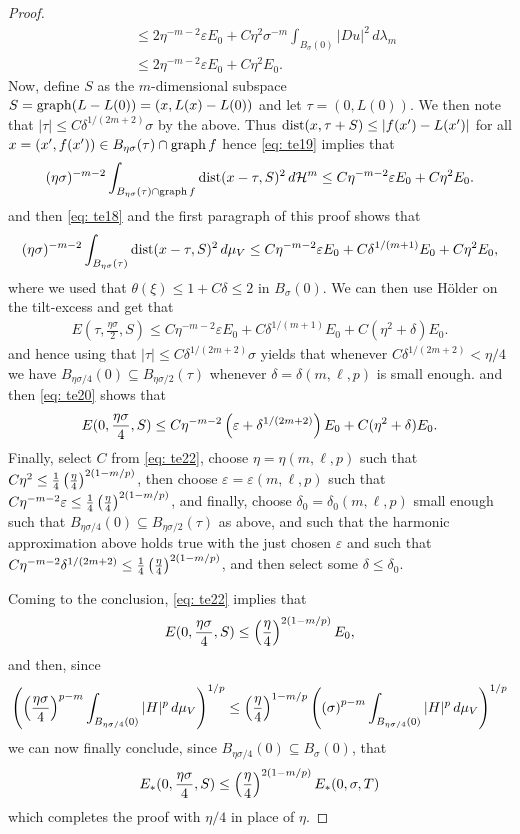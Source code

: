 \begin{proof}
\begin{align}
    &\le 2\eta^{-m-2}\varepsilon E_0 + C\eta^2\sigma^{-m} \int_{B_{\sigma}(0)} |Du|^2\, d\lambda_m \nonumber\\
    &\le 2\eta^{-m-2}\varepsilon E_0 + C\eta^2E_0.\label{eq: te19}
\end{align}
Now, define $S$ as the $m$-dimensional subspace $S=\operatorname{graph}(L-L(0)) = (x,L(x)-L(0))$ and let $\tau=(0,L(0))$. We then note that $|\tau| \le C\delta^{1/(2m+2)}\sigma$ by the above. Thus $\operatorname{dist}(x,\tau+S) \le |f(x') - L(x')|$ for all $x = (x',f(x')) \in B_{\eta\sigma}(\tau) \cap \operatorname{graph} f$ hence \eqref{eq: te19} implies that
\[
    (\eta\sigma)^{-m-2} \int_{ B_{\eta\sigma}(\tau) \cap \operatorname{graph} f } \operatorname{dist}(x - \tau, S)^2\, d\mathcal{H}^m \le C\eta^{-m-2} \varepsilon E_0 + C\eta^2E_0.
\]
and then \eqref{eq: te18} and the first paragraph of this proof shows that 
\[
    (\eta\sigma)^{-m-2} \int_{B_{\eta\sigma}(\tau)}\operatorname{dist}(x-\tau,S)^2\, d\mu_V \le C\eta^{-m-2}\varepsilon E_0 + C\delta^{1/(m+1)}E_0 + C\eta^2E_0,
\]
where we used that $\theta(\xi) \le 1 + C\delta \le 2$ in $B_{\sigma}(0)$. We can then use Hölder on the tilt-excess and get that
\begin{align}
    E(\tau, \frac{\eta\sigma}{2},S) \le C\eta^{-m-2}\varepsilon E_0 + C\delta^{1/(m+1)}E_0 + C(\eta^2 + \delta)E_0.\label{eq: te20}
\end{align}
and hence using that $|\tau|\le C\delta^{1/(2m+2)}\sigma$ yields that whenever $C\delta^{1/(2m+2)} < \eta/4$ we have $B_{\eta\sigma/4}(0) \subseteq B_{\eta\sigma/2}(\tau)$ whenever $\delta=\delta(m,\ell,p)$ is small enough. and then \eqref{eq: te20} shows that
\begin{align}
    E(0,\frac{\eta\sigma}{4},S) \le C\eta^{-m-2}\left(\varepsilon + \delta^{1/(2m+2)}\right)E_0 + C(\eta^2 + \delta)E_0.\label{eq: te22}
\end{align}
Finally, select $C$ from \eqref{eq: te22}, choose $\eta=\eta(m,\ell,p)$ such that $C\eta^2 \le \frac{1}{4}\left(\frac{\eta}{4}\right)^{2(1-m/p)}$, then choose $\varepsilon = \varepsilon(m,\ell,p)$ such that $C\eta^{-m-2}\varepsilon \le \frac{1}{4}\left(\frac{\eta}{4}\right)^{2(1-m/p)}$, and finally, choose $\delta_0=\delta_0(m,\ell,p)$ small enough such that $B_{\eta\sigma/4}(0) \subseteq B_{\eta\sigma/2}(\tau)$ as above, and such that the harmonic approximation above holds true with the just chosen $\varepsilon$ and such that $C\eta^{-m-2}\delta^{1/(2m+2)} \le \frac{1}{4}\left(\frac{\eta}{4}\right)^{2(1-m/p)}$, and then select some $\delta \le \delta_0$.

Coming to the conclusion, \eqref{eq: te22} implies that
\begin{align}
    E(0,\frac{\eta\sigma}{4},S) \le \left(\frac{\eta}{4}\right)^{2(1-m/p)}E_0,
\end{align}
and then, since
\[
    \left( \left(\frac{\eta\sigma}{4}\right)^{p-m} \int_{ B_{\eta\sigma/4}(0) } |H|^p \, d\mu_V \right)^{1/p} \le \left(\frac{\eta}{4}\right)^{1-m/p} \left( \left(\sigma\right)^{p-m} \int_{ B_{\eta\sigma/4}(0) } |H|^p \, d\mu_V \right)^{1/p}
\]
we can now finally conclude, since $B_{\eta\sigma/4}(0) \subseteq B_{\sigma}(0)$, that
\[
    E_*(0,\frac{\eta\sigma}{4},S) \le \left(\frac{\eta}{4}\right)^{2(1-m/p)}E_*(0,\sigma,T)
\]
which completes the proof with $\eta/4$ in place of $\eta$.
\end{proof}

